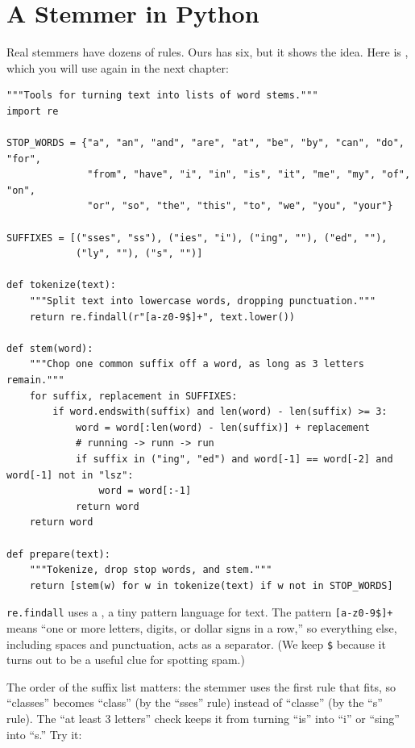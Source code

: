 \section{A Stemmer in Python}
Real stemmers have dozens of rules. Ours has six, but it shows the idea. Here is , which you
will use again in the next chapter:

\begin{verbatim}
"""Tools for turning text into lists of word stems."""
import re

STOP_WORDS = {"a", "an", "and", "are", "at", "be", "by", "can", "do", "for",
              "from", "have", "i", "in", "is", "it", "me", "my", "of", "on",
              "or", "so", "the", "this", "to", "we", "you", "your"}

SUFFIXES = [("sses", "ss"), ("ies", "i"), ("ing", ""), ("ed", ""),
            ("ly", ""), ("s", "")]

def tokenize(text):
    """Split text into lowercase words, dropping punctuation."""
    return re.findall(r"[a-z0-9$]+", text.lower())

def stem(word):
    """Chop one common suffix off a word, as long as 3 letters remain."""
    for suffix, replacement in SUFFIXES:
        if word.endswith(suffix) and len(word) - len(suffix) >= 3:
            word = word[:len(word) - len(suffix)] + replacement
            # running -> runn -> run
            if suffix in ("ing", "ed") and word[-1] == word[-2] and word[-1] not in "lsz":
                word = word[:-1]
            return word
    return word

def prepare(text):
    """Tokenize, drop stop words, and stem."""
    return [stem(w) for w in tokenize(text) if w not in STOP_WORDS]
\end{verbatim}

\verb|re.findall| uses a , a tiny pattern language for
text. The pattern \verb|[a-z0-9$]+| means ``one or more letters, digits, or dollar signs in a row,'' so
everything else, including spaces and punctuation, acts as a separator. (We keep \verb|$| because it turns out to
be a useful clue for spotting spam.)

The order of the suffix list matters: the stemmer uses the first rule that fits, so ``classes'' becomes
``class'' (by the ``sses'' rule) instead of ``classe'' (by the ``s'' rule). The ``at least 3 letters'' check keeps
it from turning ``is'' into ``i'' or ``sing'' into ``s.'' Try it:

